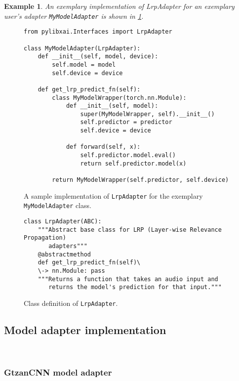 \documentclass[
    bindingoffset=5mm,  %
    footnoteindent=3mm, %
    hyphenation=true    %
]{src/wut-thesis}
\newtheorem{example}{Example}
\begin{document}
    \begin{example}
        An exemplary implementation of LrpAdapter for an exemplary user's adapter \texttt{MyModelAdapter}
        is shown in \ref{fig:UserAdapterExample}.
    \end{example}

\begin{figure}%
\begin{verbatim}
from pylibxai.Interfaces import LrpAdapter

class MyModelAdapter(LrpAdapter):
    def __init__(self, model, device):
        self.model = model
        self.device = device

    def get_lrp_predict_fn(self):
        class MyModelWrapper(torch.nn.Module):
            def __init__(self, model):
                super(MyModelWrapper, self).__init__()
                self.predictor = predictor
                self.device = device

            def forward(self, x):
                self.predictor.model.eval()
                return self.predictor.model(x)

        return MyModelWrapper(self.predictor, self.device)
\end{verbatim}
\caption{A sample implementation of \texttt{LrpAdapter} for the exemplary \texttt{MyModelAdapter} class.}
\label{fig:UserAdapterExample}
\end{figure}


\begin{figure}%
\begin{verbatim}
class LrpAdapter(ABC):
    """Abstract base class for LRP (Layer-wise Relevance Propagation)
       adapters"""
    @abstractmethod
    def get_lrp_predict_fn(self)\
    \-> nn.Module: pass
    """Returns a function that takes an audio input and
       returns the model's prediction for that input."""
\end{verbatim}
\caption{Class definition of \texttt{LrpAdapter}.}
\label{fig:LrpAdapter}
\end{figure}

\subsection{Model adapter implementation}

\

\subsubsection{GtzanCNN model adapter}
\end{document}
